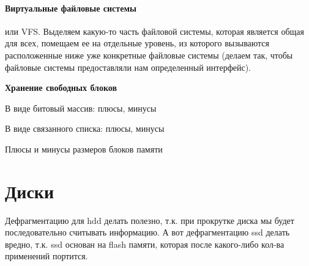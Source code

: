 \documentclass[12pt]{extarticle}
\begin{document}

\paragraph{Виртуальные файловые системы} или VFS.
Выделяем какую-то часть файловой системы, которая является общая
для всех, помещаем ее на отдельные уровень, из которого вызываются
расположенные ниже уже конкретные файловые системы (делаем так, чтобы
файловые системы предоставляли нам определенный интерфейс).


\begin{center}
    \bf Хранение свободных блоков
\end{center}

В виде битовый массив: плюсы, минусы
\par В виде связанного списка: плюсы, минусы

\par Плюсы и минусы размеров блоков памяти

\section{Диски}
Дефрагментацию для hdd делать полезно, т.к. при прокрутке диска мы будет
последовательно считывать информацию. А вот дефрагментацию ssd делать
вредно, т.к. ssd основан на flash памяти, которая после какого-либо
кол-ва применений портится.
\end{document}
